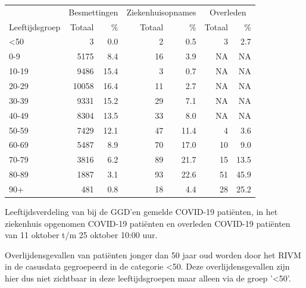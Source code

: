 \documentclass[
  english,
  man,floatsintext]{apa6}
\begin{document}
\begin{table}
\centering\begingroup\fontsize{11}{13}\selectfont

\begin{threeparttable}
\begin{tabular}{lrrrrrr}
\toprule
\multicolumn{1}{c}{ } & \multicolumn{2}{c}{Besmettingen} & \multicolumn{2}{c}{Ziekenhuisopnames} & \multicolumn{2}{c}{Overleden} \\
\cmidrule(l{3pt}r{3pt}){2-3} \cmidrule(l{3pt}r{3pt}){4-5} \cmidrule(l{3pt}r{3pt}){6-7}
Leeftijdsgroep & Totaal & \% & Totaal & \% & Totaal & \%\\
\midrule
<50 & 3 & 0.0 & 2 & 0.5 & 3 & 2.7\\
0-9 & 5175 & 8.4 & 16 & 3.9 & NA & NA\\
10-19 & 9486 & 15.4 & 3 & 0.7 & NA & NA\\
20-29 & 10058 & 16.4 & 11 & 2.7 & NA & NA\\
30-39 & 9331 & 15.2 & 29 & 7.1 & NA & NA\\
40-49 & 8304 & 13.5 & 33 & 8.0 & NA & NA\\
50-59 & 7429 & 12.1 & 47 & 11.4 & 4 & 3.6\\
60-69 & 5487 & 8.9 & 70 & 17.0 & 10 & 9.0\\
70-79 & 3816 & 6.2 & 89 & 21.7 & 15 & 13.5\\
80-89 & 1887 & 3.1 & 93 & 22.6 & 51 & 45.9\\
90+ & 481 & 0.8 & 18 & 4.4 & 28 & 25.2\\
\bottomrule
\end{tabular}
\begin{tablenotes}
\item[1] Leeftijdsverdeling van bij de GGD’en gemelde COVID-19 patiënten, in het ziekenhuis opgenomen COVID-19 patiënten en overleden COVID-19 patiënten van 11 oktober t/m 25 oktober 10:00 uur.
\item[2] Overlijdensgevallen van patiënten jonger dan 50 jaar oud worden door het RIVM in de casusdata gegroepeerd in de categorie <50. Deze overlijdensgevallen zijn hier dus niet zichtbaar in deze leeftijdsgroepen maar alleen via de groep '<50'.
\end{tablenotes}
\end{threeparttable}
\endgroup{}
\end{table}

\newpage
\end{document}
